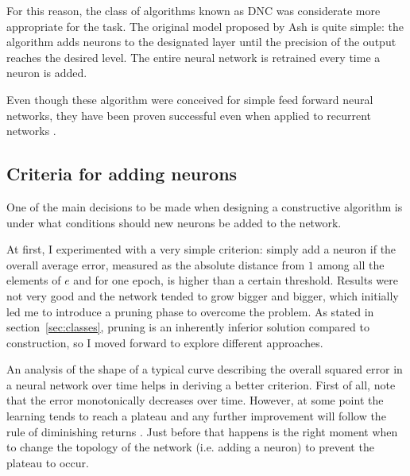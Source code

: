 \documentclass[11pt,a4paper]{report}
\begin{document}
				For this reason, the class of algorithms known as DNC was considerate more appropriate for the task. The original model proposed by Ash \cite{ash1989dynamic} is quite simple: the algorithm adds neurons to the designated layer until the precision of the output reaches the desired level. The entire neural network is retrained every time a neuron is added.
				
				Even though these algorithm were conceived for simple feed forward neural networks, they have been proven successful even when applied to recurrent networks \cite{ash1989dynamic}.
				
			\subsection{Criteria for adding neurons}
				\label{sec:criteria}
				One of the main decisions to be made when designing a constructive algorithm is under what conditions should new neurons be added to the network.
				
				At first, I experimented with a very simple criterion: simply add a neuron if the overall average error, measured as the absolute distance from $1$ among all the elements of $e$ and for one epoch, is higher than a certain threshold. Results were not very good and the network tended to grow bigger and bigger, which initially led me to introduce a pruning phase to overcome the problem. As stated in section~\ref{sec:classes}, pruning is an inherently inferior solution compared to construction, so I moved forward to explore different approaches.
				
				An analysis of the shape of a typical curve describing the overall squared error in a neural network over time helps in deriving a better criterion. First of all, note that the error monotonically decreases over time. However, at some point the learning tends to reach a plateau and any further improvement will follow the rule of diminishing returns \cite{ash1989dynamic}. Just before that happens is the right moment when to change the topology of the network (i.e. adding a neuron) to prevent the plateau to occur.
				
\end{document}

